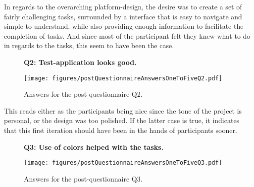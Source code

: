     In regards to the overarching platform-design, the desire was to create
    a set of fairly challenging tasks, surrounded by a interface that is easy to
    navigate and simple to understand, while also providing enough information
    to facilitate the completion of tasks. And since most of the participant felt
    they knew what to do in regards to the tasks, this seem to have been the
    case.



    \begin{figure}[h!]
      \textbf{Q2: Test-application looks good.}
      \begin{center}
        \texttt{[image: figures/postQuestionnaireAnswersOneToFiveQ2.pdf]}
        \vspace{-1cm}
        \caption{Answers for the post-questionnaire Q2.}
      \end{center}
    \end{figure}

%

    This reads either as the participants being nice since the tone of the
    project is personal, or the design was too polished. If the latter case
    is true, it indicates that this first iteration should have been in the
    hands of participants sooner.

    \begin{figure}[h!]
      \textbf{Q3: Use of colors helped with the tasks.}
      \begin{center}
        \texttt{[image: figures/postQuestionnaireAnswersOneToFiveQ3.pdf]}
        \vspace{-1cm}
        \caption{Answers for the post-questionnaire Q3.}
      \end{center}
    \end{figure}

